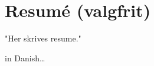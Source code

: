 \EnableQuotes{}
\chapter{Resumé (valgfrit)}
"Her skrives resume."

in Danish\dots
{}
\EnableQuotes{}

